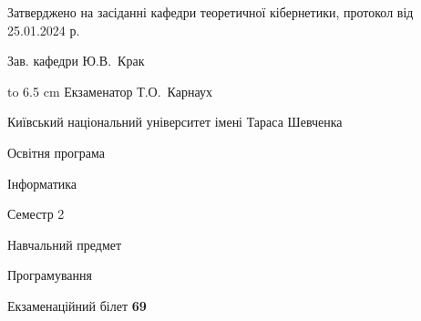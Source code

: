 \documentclass[12pt, ukrainian]{article}
\begin{document}
{\smallskip\smallskip \begin {scriptsize} Затверджено на засіданні кафедри теоретичної кібернетики, протокол   від   25.01.2024 р.\par\smallskip\smallskip\smallskip\smallskip
{\parbox {6.5 cm} {Зав. кафедри \dotfill Ю.В.~Крак}}\hspace {0.7cm} {\hbox to 6.5 cm { Екзаменатор \dotfill Т.О.~Карнаух}} \end{scriptsize}}
\newpage
{{\begin {scriptsize}\par
{ \center  Київський національний університет імені Тараса Шевченка \par}
{\parbox {5 cm}{Освітня програма \hfill}{\parbox {7 cm}{Інформатика\hfill}}\parbox {6 cm}{\hfill Семестр 2}}\par
{\parbox {5 cm} {Навчальний предмет \hfill}\parbox {7 cm}{Програмування \hfill}\parbox {6cm}{\hfill}\par}\vspace{-15pt} \end{scriptsize}}{\center Екзаменаційний білет \No \textbf { 69 }\par}}
\end{document}
